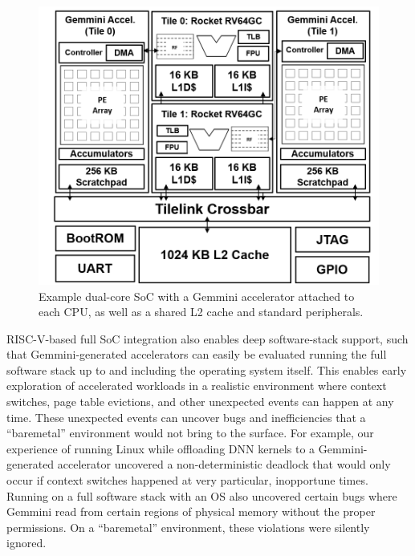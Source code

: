 \begin{figure}[t]
     \centering
     \includegraphics[width=0.75\linewidth]{fig/contention-soc.png}
     \caption{Example dual-core SoC with a Gemmini accelerator attached to each CPU, as well as a shared L2 cache and standard peripherals.}
     \label{fig:contention-soc}
     \vspace{-0.2in}
 \end{figure}

RISC-V-based full SoC integration also enables deep software-stack support, such that Gemmini-generated accelerators can easily be evaluated running the full software stack up to and including the operating system itself. This enables early exploration of accelerated workloads in a realistic environment where context switches, page table evictions, and other unexpected events can happen at any time. These unexpected events can uncover bugs and inefficiencies that a ``baremetal'' environment would not bring to the surface. For example, our experience of running Linux while offloading DNN kernels to a Gemmini-generated accelerator uncovered a non-deterministic deadlock that would only occur if context switches happened at very particular, inopportune times.
Running on a full software stack with an OS also uncovered certain bugs where Gemmini read from certain regions of physical memory without the proper permissions. On a ``baremetal'' environment, these violations were silently ignored.


